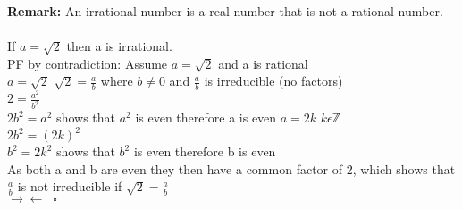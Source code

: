 \documentclass[12pt]{article}
\begin{document}
\begin{enumerate}
    \textbf{Remark:} An irrational number is a real number that is not a rational number.  \\
    \\ 
    If $a=\sqrt{2}$ then a is irrational.  \\ 
    PF by contradiction: Assume $a=\sqrt{2}$ and a is rational \\
    $a = \sqrt{2}$ \;\;\; $\sqrt{2} = \frac{a}{b}$ where $b \neq 0$  and $\frac{a}{b}$ is irreducible (no factors) \\ 
    $2 = \frac{a^2}{b^2}$ \\ 
    $2b^2= a^2$ \;\; shows that $a^2$ is even therefore a is even $a = 2k$ \;\; $k \epsilon \mathbb{Z}$\\
    $2b^2 = (2k)^2$ \\
    $b^2 = 2k^2$ \;\; shows that $b^2$ is even therefore b is even \\ 
    As both a and b are even they then have a common factor of 2, which shows that $\frac{a}{b}$ is not irreducible if $\sqrt{2} = \frac{a}{b}$ \\ 
    $ \rightarrow \leftarrow \;\; \square$ \\ 
    
\end{enumerate}
\end{document}
